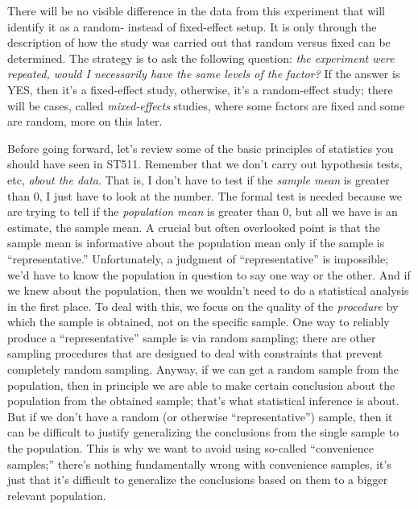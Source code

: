 \documentclass[a4paper, 12pt]{article}
\theoremstyle{plain}
\theoremstyle{definition}
\theoremstyle{remark}
\begin{document}
There will be no visible difference in the data from this experiment that will identify it as a random- instead of fixed-effect setup.  It is only through the description of how the study was carried out that random versus fixed can be determined.  The strategy is to ask the following question: {\em the experiment were repeated, would I necessarily have the same levels of the factor?}  If the answer is YES, then it's a fixed-effect study, otherwise, it's a random-effect study; there will be cases, called {\em mixed-effects} studies, where some factors are fixed and some are random, more on this later.  

Before going forward, let's review some of the basic principles of statistics you should have seen in ST511.  Remember that we don't carry out hypothesis tests, etc, {\em about the data}.  That is, I don't have to test if the {\em sample mean} is greater than 0, I just have to look at the number.  The formal test is needed because we are trying to tell if the {\em population mean} is greater than 0, but all we have is an estimate, the sample mean.  A crucial but often overlooked point is that the sample mean is informative about the population mean only if the sample is ``representative.''  Unfortunately, a judgment of ``representative'' is impossible; we'd have to know the population in question to say one way or the other.  And if we knew about the population, then we wouldn't need to do a statistical analysis in the first place.  To deal with this, we focus on the quality of the {\em procedure} by which the sample is obtained, not on the specific sample.  One way to reliably produce a ``representative'' sample is via random sampling; there are other sampling procedures that are designed to deal with constraints that prevent completely random sampling.  Anyway, if we can get a random sample from the population, then in principle we are able to make certain conclusion about the population from the obtained sample; that's what statistical inference is about.  But if we don't have a random (or otherwise ``representative'') sample, then it can be difficult to justify generalizing the conclusions from the single sample to the population.  This is why we want to avoid using so-called ``convenience samples;'' there's nothing fundamentally wrong with convenience samples, it's just that it's difficult to generalize the conclusions based on them to a bigger relevant population.  
\end{document}
